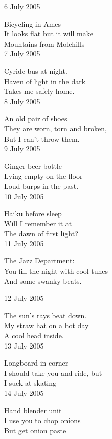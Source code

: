 \documentclass[12pt]{article}
\begin{document}
\newpage
\setlength{\parskip}{1mm}

6 July 2005

Bicycling in Ames \\
It looks flat but it will make \\
Mountains from Molehills \\

7 July 2005

Cyride bus at night. \\
Haven of light in the dark \\
Takes me safely home. \\

8 July 2005

An old pair of shoes \\
They are worn, torn and broken, \\
But I can't throw them. \\

9 July 2005

Ginger beer bottle \\
Lying empty on the floor \\
Loud burps in the past. \\

10 July 2005

Haiku before sleep \\
Will I remember it at \\
The dawn of first light? \\

11 July 2005

The Jazz Department: \\
You fill the night with cool tunes \\
And some swanky beats. \\
 
\newpage

12 July 2005

The sun's rays beat down. \\
My straw hat on a hot day \\
A cool head inside. \\

13 July 2005

Longboard in corner \\
I should take you and ride, but \\
I suck at skating \\

14 July 2005

Hand blender unit \\
I use you to chop onions \\
But get onion paste \\
\end{document}
